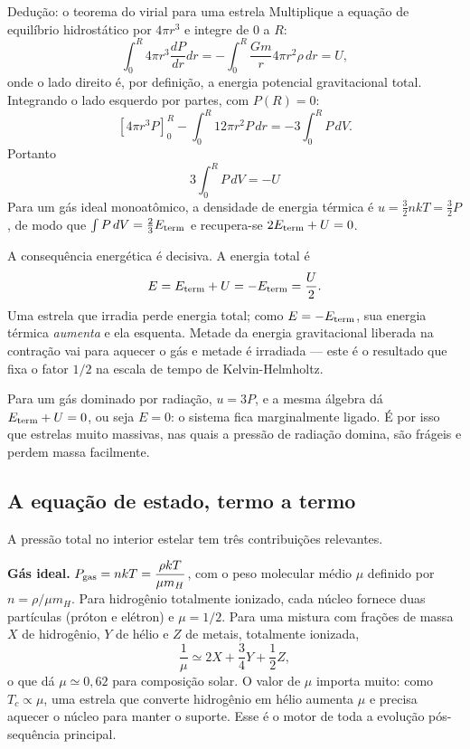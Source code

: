 \documentclass[11pt,a4paper]{article}
\begin{document}
\begin{lessonblock}[borderline west={2pt}{0pt}{astroGold}]{Dedução: o teorema do virial para uma estrela}
Multiplique a equação de equilíbrio hidrostático por $4\pi r^{3}$ e integre de $0$ a $R$:
\[
\int_0^R 4\pi r^{3}\frac{dP}{dr}dr=-\int_0^R\frac{Gm}{r}4\pi r^{2}\rho\,dr=U,
\]
onde o lado direito é, por definição, a energia potencial gravitacional total. Integrando o lado esquerdo por partes, com $P(R)=0$:
\[
\left[4\pi r^{3}P\right]_0^R-\int_0^R 12\pi r^{2}P\,dr=-3\int_0^R P\,dV.
\]
Portanto
\[
\boxed{\ 3\int_0^R P\,dV=-U\ }
\]
Para um gás ideal monoatômico, a densidade de energia térmica é $u=\frac{3}{2}nkT=\frac{3}{2}P$, de modo que $\int P\,dV=\frac{2}{3}E_{\rm term}$ e recupera-se $2E_{\rm term}+U=0$.

A consequência energética é decisiva. A energia total é
\[
E=E_{\rm term}+U=-E_{\rm term}=\frac{U}{2}.
\]
Uma estrela que irradia perde energia total; como $E=-E_{\rm term}$, sua energia térmica \emph{aumenta} e ela esquenta. Metade da energia gravitacional liberada na contração vai para aquecer o gás e metade é irradiada --- este é o resultado que fixa o fator $1/2$ na escala de tempo de Kelvin-Helmholtz.

Para um gás dominado por radiação, $u=3P$, e a mesma álgebra dá $E_{\rm term}+U=0$, ou seja $E=0$: o sistema fica marginalmente ligado. É por isso que estrelas muito massivas, nas quais a pressão de radiação domina, são frágeis e perdem massa facilmente.
\end{lessonblock}

\subsection*{A equação de estado, termo a termo}

A pressão total no interior estelar tem três contribuições relevantes.

\textbf{Gás ideal.} $P_{\rm gas}=nkT=\dfrac{\rho kT}{\mu m_H}$, com o peso molecular médio $\mu$ definido por $n=\rho/\mu m_H$. Para hidrogênio totalmente ionizado, cada núcleo fornece duas partículas (próton e elétron) e $\mu=1/2$. Para uma mistura com frações de massa $X$ de hidrogênio, $Y$ de hélio e $Z$ de metais, totalmente ionizada,
\[
\frac{1}{\mu}\simeq2X+\frac{3}{4}Y+\frac{1}{2}Z,
\]
o que dá $\mu\simeq0{,}62$ para composição solar. O valor de $\mu$ importa muito: como $T_c\propto\mu$, uma estrela que converte hidrogênio em hélio aumenta $\mu$ e precisa aquecer o núcleo para manter o suporte. Esse é o motor de toda a evolução pós-sequência principal.
\end{document}

